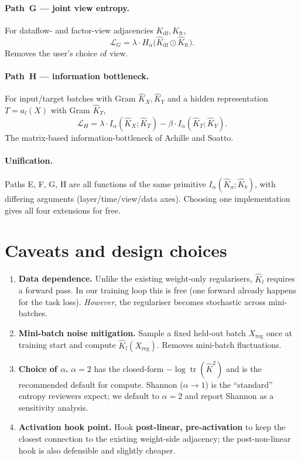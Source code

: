 \documentclass[11pt,a4paper]{article}
\newcommand{\trace}{\operatorname{tr}}
\newcommand{\Khat}{\hat{K}}
\begin{document}
\paragraph{Path~G --- joint view entropy.}
For dataflow- and factor-view adjacencies $K_{\text{df}}, K_{\text{ft}}$,
\[
\mathcal{L}_G = \lambda \cdot H_\alpha
                \bigl(\Khat_{\text{df}} \odot \Khat_{\text{ft}}\bigr).
\]
Removes the user's choice of view.

\paragraph{Path~H --- information bottleneck.}
For input/target batches with Gram $\Khat_X, \Khat_Y$ and a hidden
representation $T = a_l(X)$ with Gram $\Khat_T$,
\[
\mathcal{L}_H = \lambda \cdot I_\alpha(\Khat_X ; \Khat_T)
                - \beta \cdot I_\alpha(\Khat_T ; \Khat_Y).
\]
The matrix-based information-bottleneck of Achille and Soatto.

\paragraph{Unification.} Paths E, F, G, H are all functions of the same
primitive $I_\alpha(\Khat_a ; \Khat_b)$, with differing arguments
(layer/time/view/data axes). Choosing one implementation gives all four
extensions for free.

\section{Caveats and design choices}

\begin{enumerate}
  \item \textbf{Data dependence.} Unlike the existing weight-only
        regularisers, $\Khat_l$ requires a forward pass. In our training
        loop this is free (one forward already happens for the task
        loss). \emph{However}, the regulariser becomes stochastic across
        mini-batches.
  \item \textbf{Mini-batch noise mitigation.} Sample a fixed held-out
        batch $X_{\text{reg}}$ once at training start and compute
        $\Khat_l(X_{\text{reg}})$. Removes mini-batch fluctuations.
  \item \textbf{Choice of $\alpha$.} $\alpha = 2$ has the closed-form
        $-\log \trace(\Khat^2)$ and is the recommended default for
        compute. Shannon ($\alpha\to1$) is the ``standard'' entropy
        reviewers expect; we default to $\alpha = 2$ and report
        Shannon as a sensitivity analysis.
  \item \textbf{Activation hook point.} Hook \textbf{post-linear,
        pre-activation} to keep the closest connection to the existing
        weight-side adjacency; the post-non-linear hook is also
        defensible and slightly cheaper.
\end{enumerate}
\end{document}
